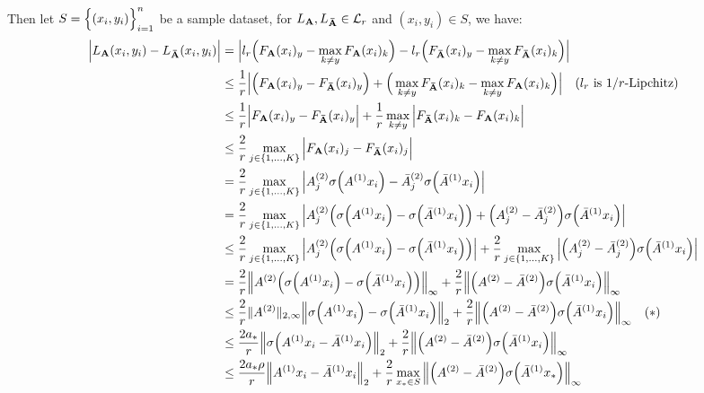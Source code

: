 \noindent Then let $S=\Big\{ (x_i, y_i) \Big\}_{i=1}^n$ be a sample dataset, for $L_{\bf A}, L_{\bf \bar A}\in\mathcal{L}_r$ and $(x_i, y_i)\in S$, we have:
\begin{align*}
    \Big| L_{\bf A}(x_i, y_i) - L_{\bf \bar A}(x_i, y_i) \Big| &= \Big| 
        l_r\Big( 
            F_{\bf A}(x_i)_y - \max_{k\ne y} F_{\bf A}(x_i)_k
         \Big) - 
        l_r\Big( 
            F_{\bf \bar A}(x_i)_y - \max_{k\ne y} F_{\bf \bar A}(x_i)_k
         \Big)
     \Big| \\
    &\le \frac{1}{r} \Big| 
        \Big( F_{\bf A}(x_i)_y - F_{\bf \bar A}(x_i)_y \Big) +
        \Big( 
            \max_{k\ne y} F_{\bf \bar A}(x_i)_k - \max_{k\ne y} F_{\bf A}(x_i)_k
         \Big)
     \Big| \ \ \ \text{($l_r$ is $1/r$-Lipchitz)} \\
    &\le \frac{1}{r} \Big| 
        F_{\bf A}(x_i)_y - F_{\bf \bar A}(x_i)_y
     \Big| + \frac{1}{r}\max_{k\ne y}\Big| 
        F_{\bf \bar A}(x_i)_k - F_{\bf A}(x_i)_k
     \Big| \\
    &\le \frac{2}{r}\max_{j\in\{1, \dots, K\}} \Big| F_{\bf A}(x_i)_j - F_{\bf \bar A}(x_i)_j \Big| \\
    &= \frac{2}{r}\max_{j\in\{1, \dots, K\}} \Big| 
        A^{(2)}_j\sigma\Big( A^{(1)}x_i \Big) - \bar A^{(2)}_j\sigma\Big( \bar A^{(1)}x_i \Big)
     \Big| \\
    &= \frac{2}{r}\max_{j\in\{1, \dots, K\}} \Big| 
        A_j^{(2)}\Big( \sigma\Big( A^{(1)}x_i \Big) - \sigma\Big( \bar A^{(1)}x_i \Big) \Big)
        + \Big( A_j^{(2)} - \bar A_j^{(2)} \Big)\sigma\Big( \bar A^{(1)}x_i \Big) 
     \Big| \\
    &\le \frac{2}{r}\max_{j\in\{1, \dots, K\}}\Big| 
        A_j^{(2)}\Big( \sigma\Big( A^{(1)}x_i \Big) - \sigma\Big( \bar A^{(1)}x_i \Big) \Big)
     \Big| + \frac{2}{r}\max_{j\in\{1, \dots, K\}}\Big| 
        \Big( A_j^{(2)} - \bar A_j^{(2)} \Big)\sigma\Big( \bar A^{(1)}x_i \Big) 
     \Big| \\
    &= \frac{2}{r}\Big\| 
        A^{(2)}\Big( \sigma\Big( A^{(1)}x_i \Big) - \sigma\Big( \bar A^{(1)}x_i \Big) \Big)
    \Big\|_\infty + 
    \frac{2}{r}\Big\|
        \Big( A^{(2)} - \bar A^{(2)} \Big)\sigma\Big( \bar A^{(1)}x_i \Big) 
    \Big\|_\infty \\
    &\le \frac{2}{r} \|A^{(2)}\|_{2,\infty} \Big\| \sigma\Big( A^{(1)}x_i \Big) - \sigma\Big( \bar A^{(1)}x_i \Big) \Big\|_2  + \frac{2}{r} \Big\| \Big( A^{(2)} - \bar A^{(2)} \Big)\sigma\Big( \bar A^{(1)}x_i \Big) \Big\|_\infty \ \ \ (*) \\
    &\le \frac{2a_*}{r} \Big\| \sigma\Big( A^{(1)}x_i - \bar A^{(1)}x_i \Big)\Big\|_2 + \frac{2}{r} \Big\| \Big( A^{(2)} - \bar A^{(2)} \Big)\sigma\Big( \bar A^{(1)}x_i \Big) \Big\|_\infty \\
    &\le \frac{2a_*\rho}{r} \Big\| A^{(1)}x_i - \bar A^{(1)}x_i \Big\|_2 + \frac{2}{r} \max_{x_* \in S}\Big\| \Big( A^{(2)} - \bar A^{(2)} \Big)\sigma\Big( \bar A^{(1)}x_* \Big) \Big\|_\infty \\
\end{align*}


